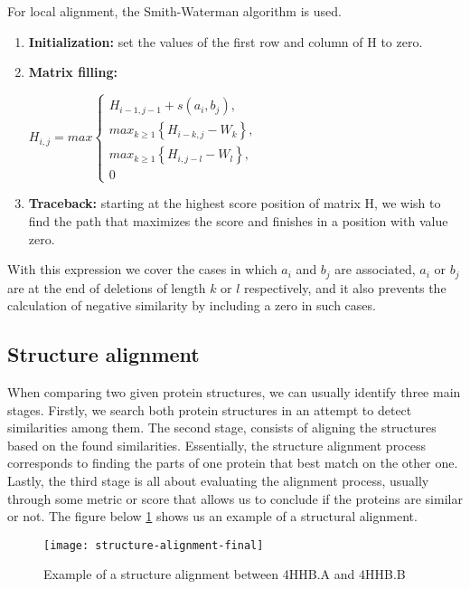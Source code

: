 For local alignment, the Smith-Waterman \cite{smith1981identification} algorithm is used.

\begin{enumerate}
	\item \textbf{Initialization:} set the values of the first row and column of H to zero.
	
	\item \textbf{Matrix filling:} 
	
\begin{center}
	$ H_{i,j} = max\begin{cases}H_{i-1,j-1} + s(a_{i},b_{j}), 
	\\ max_{k\geq1} \left\{ H_{i-k,j}- W_{k} \right\},
	\\ max_{k\geq1} \left\{ H_{i,j-l}- W_{l} \right\},
	\\ 0\end{cases} $
\end{center}

	\item \textbf{Traceback:} starting at the highest score position of matrix H, we wish to find the path that maximizes the score and finishes in a position with value zero. 
\end{enumerate}

With this expression we cover the cases in which $ a_{i} $ and $ b_{j} $ are associated, $ a_{i} $ or $ b_{j} $ are at the end of deletions of length $ k $ or $ l $ respectively, and it also prevents the calculation of negative similarity by including a zero in such cases.

\subsection{Structure alignment} 

When comparing two given protein structures, we can usually identify three main stages. Firstly, we search both protein structures in an attempt to detect similarities among them. The second stage, consists of aligning the structures based on the found similarities. Essentially, the structure alignment process corresponds to finding the parts of one protein that best match on the other one. Lastly, the third stage is all about evaluating the alignment process, usually through some metric or score that allows us to conclude if the proteins are similar or not. The figure below \ref{fig:structurealignment} shows us an example of a structural alignment.

\begin{figure}[htbp]
	\centering
	\texttt{[image: structure-alignment-final]}
	\caption{Example of a structure alignment between 4HHB.A and 4HHB.B}
	\label{fig:structurealignment}
\end{figure}

